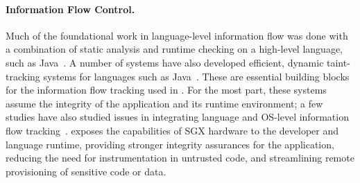 




\paragraph{Information Flow Control.}
Much of the foundational work in language-level information flow was done with a combination of static analysis
and runtime checking on a high-level language, such as Java~\citep{myers1999jflow, banerjee2002secure, hammer2006information, franz2008eliminating, chandra2007fine, smith2007improving, yip2009improving}.
A number of systems have also developed efficient, dynamic taint-tracking systems for languages such as Java~\citep{haldar2005dynamic, nair2008virtual}.
These are essential building blocks for the information flow tracking used in \systemname{}.
For the most part, these systems assume the integrity of the application and its runtime environment;
a few studies have also studied issues in integrating language and OS-level information flow tracking~\citep{roy2009laminar, sabelfeld2003language}.
\systemname{} exposes the capabilities of  SGX hardware to the developer and language runtime, providing
stronger integrity assurances for the application, reducing the need for instrumentation in untrusted code, and 
streamlining remote provisioning of sensitive code or data.

